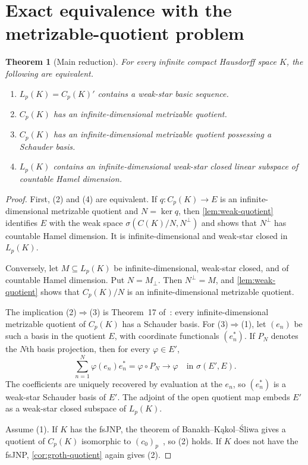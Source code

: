 \documentclass[11pt]{article}
\newtheorem{theorem}{Theorem}[section]
\newcommand{\Cp}{C_p}
\newcommand{\Lp}{L_p}
\newcommand{\czerop}{(c_0)_p}
\begin{document}
\section{Exact equivalence with the metrizable-quotient problem}

\begin{theorem}[Main reduction]\label{thm:equivalence}
For every infinite compact Hausdorff space $K$, the following are equivalent.
\begin{enumerate}[label=\textup{(\arabic*)}]
\item $\Lp(K)=\Cp(K)'$ contains a weak-star basic sequence.
\item $\Cp(K)$ has an infinite-dimensional metrizable quotient.
\item $\Cp(K)$ has an infinite-dimensional metrizable quotient possessing a
      Schauder basis.
\item $\Lp(K)$ contains an infinite-dimensional weak-star closed linear
      subspace of countable Hamel dimension.
\end{enumerate}
\end{theorem}

\begin{proof}
First, \textup{(2)} and \textup{(4)} are equivalent.  If
$q:\Cp(K)\to E$ is an infinite-dimensional metrizable quotient and
$N=\ker q$, then \cref{lem:weak-quotient} identifies $E$ with the weak space
$\sigma(C(K)/N,N^\perp)$ and shows that $N^\perp$ has countable Hamel
dimension.  It is infinite-dimensional and weak-star closed in $\Lp(K)$.

Conversely, let $M\subseteq\Lp(K)$ be infinite-dimensional, weak-star closed,
and of countable Hamel dimension.  Put $N=M_\perp$.  Then $N^\perp=M$, and
\cref{lem:weak-quotient} shows that $\Cp(K)/N$ is an infinite-dimensional
metrizable quotient.

The implication \textup{(2)}$\Rightarrow$\textup{(3)} is
Theorem~17 of~\cite{KLS2026}: every infinite-dimensional metrizable quotient
of $\Cp(K)$ has a Schauder basis.  For
\textup{(3)}$\Rightarrow$\textup{(1)}, let $(e_n)$ be such a basis in the
quotient $E$, with coordinate functionals $(e_n^*)$.  If $P_N$ denotes the
$N$th basis projection, then for every $\varphi\in E'$,
\[
 \sum_{n=1}^N \varphi(e_n)e_n^*=\varphi\circ P_N
 \longrightarrow\varphi
 \quad\text{in }\sigma(E',E).
\]
The coefficients are uniquely recovered by evaluation at the $e_n$, so
$(e_n^*)$ is a weak-star Schauder basis of $E'$.  The adjoint of the open
quotient map embeds $E'$ as a weak-star closed subspace of $\Lp(K)$.

Assume \textup{(1)}.  If $K$ has the fsJNP, the theorem of
Banakh--K\k{a}kol--\'Sliwa gives a quotient of $\Cp(K)$ isomorphic to
$\czerop$~\cite[Theorem~1]{BKS2019JNP}, so \textup{(2)} holds.  If $K$
does not have the fsJNP, \cref{cor:groth-quotient} again gives
\textup{(2)}.
\end{proof}
\end{document}
